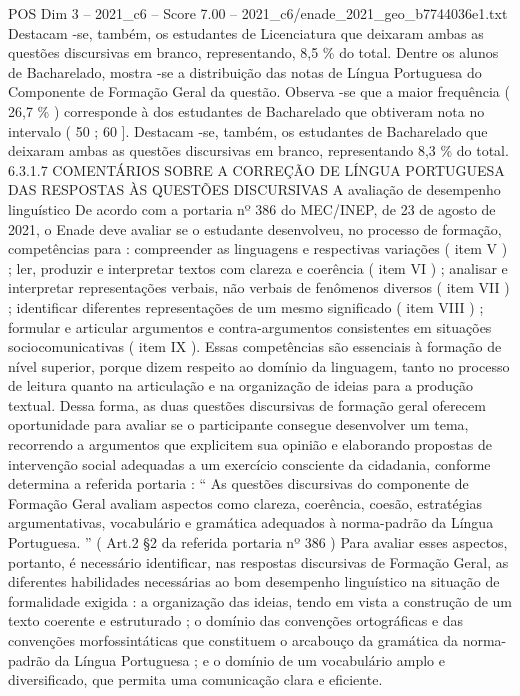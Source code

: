 \begin{textsample}{POS Dim 3 – 2021\_c6 – Score 7.00 – 2021\_c6/enade\_2021\_geo\_b7744036e1.txt}
Destacam -se, também, os estudantes de Licenciatura que deixaram ambas as questões discursivas em branco, representando, 8,5 \% do total.
Dentre os alunos de Bacharelado, mostra -se a distribuição das notas de Língua Portuguesa do Componente de Formação Geral da questão.
Observa -se que a maior frequência ( 26,7 \% ) corresponde à dos estudantes de Bacharelado que obtiveram nota no intervalo ( 50 ; 60 ].
Destacam -se, também, os estudantes de Bacharelado que deixaram ambas as questões discursivas em branco, representando 8,3 \% do total. 6.3.1.7 COMENTÁRIOS SOBRE A CORREÇÃO DE LÍNGUA PORTUGUESA DAS RESPOSTAS ÀS QUESTÕES DISCURSIVAS A avaliação de desempenho linguístico De acordo com a portaria nº 386 do MEC/INEP, de 23 de agosto de 2021, o Enade deve avaliar se o estudante desenvolveu, no processo de formação, competências para : compreender as linguagens e respectivas variações ( item V ) ; ler, produzir e interpretar textos com clareza e coerência ( item VI ) ; analisar e interpretar representações verbais, não verbais de fenômenos diversos ( item VII ) ; identificar diferentes representações de um mesmo significado ( item VIII ) ; formular e articular argumentos e contra-argumentos consistentes em situações sociocomunicativas ( item IX ).
Essas competências são essenciais à formação de nível superior, porque dizem respeito ao domínio da linguagem, tanto no processo de leitura quanto na articulação e na organização de ideias para a produção textual.
Dessa forma, as duas questões discursivas de formação geral oferecem oportunidade para avaliar se o participante consegue desenvolver um tema, recorrendo a argumentos que explicitem sua opinião e elaborando propostas de intervenção social adequadas a um exercício consciente da cidadania, conforme determina a referida portaria : “ As questões discursivas do componente de Formação Geral avaliam aspectos como clareza, coerência, coesão, estratégias argumentativas, vocabulário e gramática adequados à norma-padrão da Língua Portuguesa. ” ( Art.2 §2 da referida portaria nº 386 ) Para avaliar esses aspectos, portanto, é necessário identificar, nas respostas discursivas de Formação Geral, as diferentes habilidades necessárias ao bom desempenho linguístico na situação de formalidade exigida : a organização das ideias, tendo em vista a construção de um texto coerente e estruturado ; o domínio das convenções ortográficas e das convenções morfossintáticas que constituem o arcabouço da gramática da norma-padrão da Língua Portuguesa ; e o domínio de um vocabulário amplo e diversificado, que permita uma comunicação clara e eficiente.

\end{textsample}
